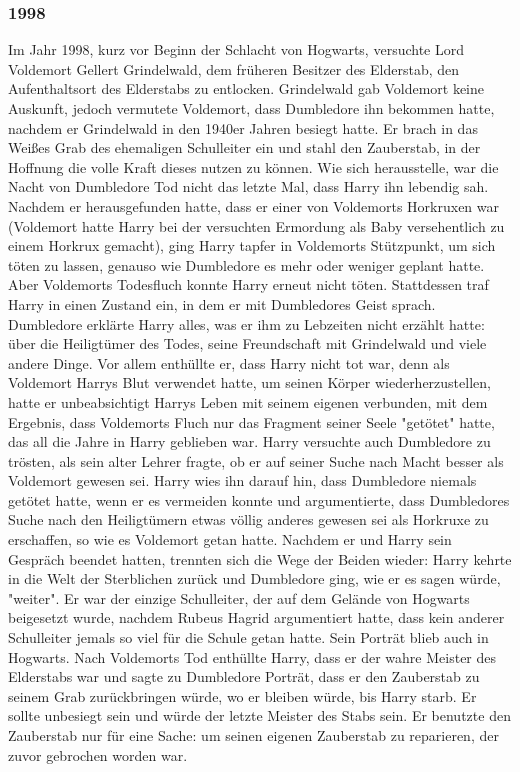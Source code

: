 \documentclass[a4paper, 10pt]{article}
\begin{document}
\subsubsection*{1998}
Im Jahr 1998, kurz vor Beginn der Schlacht von Hogwarts, versuchte Lord Voldemort Gellert Grindelwald, dem früheren Besitzer des Elderstab, den Aufenthaltsort des Elderstabs zu entlocken. Grindelwald gab Voldemort keine Auskunft, jedoch vermutete Voldemort, dass Dumbledore ihn bekommen hatte, nachdem er Grindelwald in den 1940er Jahren besiegt hatte. Er brach in das Weißes Grab des ehemaligen Schulleiter ein und stahl den Zauberstab, in der Hoffnung die volle Kraft dieses nutzen zu können.
\vspace{10pt}
\newline
Wie sich herausstelle, war die Nacht von Dumbledore Tod nicht das letzte Mal, dass Harry ihn lebendig sah. Nachdem er herausgefunden hatte, dass er einer von Voldemorts Horkruxen war (Voldemort hatte Harry bei der versuchten Ermordung als Baby versehentlich zu einem Horkrux gemacht), ging Harry tapfer in Voldemorts Stützpunkt, um sich töten zu lassen, genauso wie
Dumbledore es mehr oder weniger geplant hatte. Aber Voldemorts Todesfluch konnte Harry erneut nicht töten. Stattdessen traf Harry in einen Zustand ein, in dem er mit Dumbledores Geist sprach. Dumbledore erklärte Harry alles, was er ihm zu Lebzeiten nicht erzählt hatte: über die Heiligtümer des Todes, seine Freundschaft mit Grindelwald und viele andere Dinge.
\vspace{10pt}
\newline
Vor allem enthüllte er, dass Harry nicht tot war, denn als Voldemort Harrys Blut verwendet hatte, um seinen Körper wiederherzustellen, hatte er unbeabsichtigt Harrys Leben mit seinem eigenen verbunden, mit dem Ergebnis, dass Voldemorts Fluch nur das Fragment seiner Seele "getötet" hatte, das all die Jahre in Harry geblieben war. Harry versuchte auch Dumbledore zu trösten, als sein alter Lehrer fragte, ob er auf seiner Suche nach Macht besser als Voldemort gewesen sei. Harry wies ihn darauf hin, dass Dumbledore niemals getötet hatte, wenn er es vermeiden konnte und argumentierte, dass Dumbledores Suche nach den Heiligtümern etwas völlig anderes gewesen sei als Horkruxe zu erschaffen, so wie es Voldemort getan hatte.
\vspace{10pt}
\newline
Nachdem er und Harry sein Gespräch beendet hatten, trennten sich die Wege der Beiden wieder: Harry kehrte in die Welt der Sterblichen zurück und Dumbledore ging, wie er es sagen würde, "weiter". Er war der einzige Schulleiter, der auf dem Gelände von Hogwarts beigesetzt wurde, nachdem Rubeus Hagrid argumentiert hatte, dass kein anderer Schulleiter jemals so viel für die Schule getan hatte. Sein Porträt blieb auch in Hogwarts. Nach Voldemorts Tod enthüllte Harry, dass er der wahre Meister des Elderstabs war und sagte zu Dumbledore Porträt, dass er den Zauberstab zu seinem Grab zurückbringen würde, wo er bleiben würde, bis Harry starb. Er sollte unbesiegt sein und würde der letzte Meister des Stabs sein. Er benutzte den Zauberstab nur für eine Sache: um seinen eigenen Zauberstab zu reparieren, der zuvor gebrochen worden war.
\end{document}
